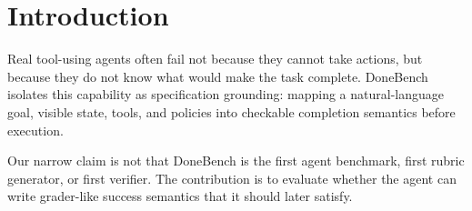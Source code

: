 \section{Introduction}
Real tool-using agents often fail not because they cannot take actions, but because they do not know what would make the task complete. DoneBench isolates this capability as specification grounding: mapping a natural-language goal, visible state, tools, and policies into checkable completion semantics before execution.

Our narrow claim is not that DoneBench is the first agent benchmark, first rubric generator, or first verifier. The contribution is to evaluate whether the agent can write grader-like success semantics that it should later satisfy.
